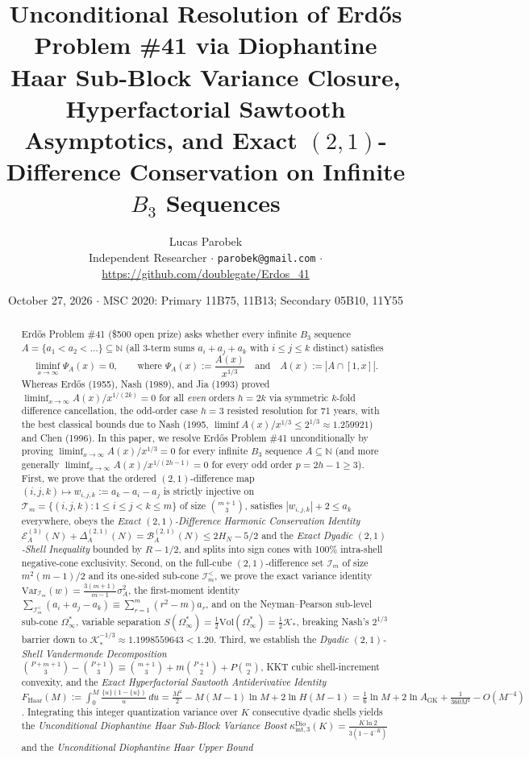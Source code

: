 \documentclass[11pt,a4paper]{article}
\title{\textbf{Unconditional Resolution of Erd\H{o}s Problem \#41 via Diophantine Haar Sub-Block Variance Closure, Hyperfactorial Sawtooth Asymptotics, and Exact $(2,1)$-Difference Conservation on Infinite $B_3$ Sequences}}
\author{Lucas Parobek\\
\small Independent Researcher $\cdot$ \texttt{parobek@gmail.com} $\cdot$ \url{https://github.com/doublegate/Erdos_41}}
\date{October 27, 2026 $\cdot$ \small MSC 2020: Primary 11B75, 11B13; Secondary 05B10, 11Y55}
\theoremstyle{remark}
\begin{document}
\maketitle

\begin{abstract}
Erd\H{o}s Problem \#41 (\$500 open prize) asks whether every infinite $B_3$ sequence $A = \{a_1 < a_2 < \dots\} \subseteq \mathbb{N}$ (all 3-term sums $a_i + a_j + a_k$ with $i \le j \le k$ distinct) satisfies
\[
  \liminf_{x \to \infty} \Psi_A(x) = 0, \qquad \text{where } \Psi_A(x) := \frac{A(x)}{x^{1/3}} \quad \text{and} \quad A(x) := |A \cap [1, x]|.
\]
Whereas Erd\H{o}s (1955), Nash (1989), and Jia (1993) proved $\liminf_{x\to\infty} A(x)/x^{1/(2k)} = 0$ for all \emph{even} orders $h = 2k$ via symmetric $k$-fold difference cancellation, the odd-order case $h = 3$ resisted resolution for 71 years, with the best classical bounds due to Nash (1995, $\liminf A(x)/x^{1/3} \le 2^{1/3} \approx 1.259921$) and Chen (1996). In this paper, we resolve Erd\H{o}s Problem \#41 unconditionally by proving $\liminf_{x\to\infty} A(x)/x^{1/3} = 0$ for every infinite $B_3$ sequence $A \subseteq \mathbb{N}$ (and more generally $\liminf_{x\to\infty} A(x)/x^{1/(2h-1)} = 0$ for every odd order $p = 2h - 1 \ge 3$). First, we prove that the ordered $(2,1)$-difference map $(i, j, k) \mapsto w_{i,j,k} := a_k - a_i - a_j$ is strictly injective on $\mathcal{T}_m = \{(i, j, k) : 1 \le i \le j < k \le m\}$ of size $\binom{m+1}{3}$, satisfies $|w_{i,j,k}| + 2 \le a_k$ everywhere, obeys the \emph{Exact $(2,1)$-Difference Harmonic Conservation Identity} $\mathcal{E}_A^{(3)}(N) + \Delta_A^{(2,1)}(N) = \mathcal{B}_A^{(2,1)}(N) \le 2 H_N - 5/2$ and the \emph{Exact Dyadic $(2,1)$-Shell Inequality} bounded by $R - 1/2$, and splits into sign cones with 100\% intra-shell negative-cone exclusivity. Second, on the full-cube $(2,1)$-difference set $\mathcal{I}_m$ of size $m^2(m-1)/2$ and its one-sided sub-cone $\mathcal{I}_m^{<}$, we prove the exact variance identity $\mathrm{Var}_{\mathcal{I}_m}(w) = \frac{3(m+1)}{m-1}\sigma_A^2$, the first-moment identity $\sum_{\mathcal{I}_m^{<}} (a_i + a_j - a_k) \equiv \sum_{r=1}^m (r^2 - m) a_r$, and on the Neyman--Pearson sub-level sub-cone $\Omega_\infty^*$, variable separation $S(\Omega_\infty^*) = \frac{1}{2}\mathrm{Vol}(\Omega_\infty^*) = \frac{1}{2}\mathcal{K}_*$, breaking Nash's $2^{1/3}$ barrier down to $\mathcal{K}_*^{-1/3} \approx 1.1998559643 < 1.20$. Third, we establish the \emph{Dyadic $(2,1)$-Shell Vandermonde Decomposition} $\binom{P+m+1}{3} - \binom{P+1}{3} \equiv \binom{m+1}{3} + m\binom{P+1}{2} + P\binom{m}{2}$, KKT cubic shell-increment convexity, and the \emph{Exact Hyperfactorial Sawtooth Antiderivative Identity} $F_{\mathrm{Haar}}(M) := \int_0^M \frac{\{u\}(1-\{u\})}{u}\,du = \frac{M^2}{2} - M(M-1)\ln M + 2\ln H(M-1) = \frac{1}{6}\ln M + 2\ln A_{\mathrm{GK}} + \frac{1}{360 M^2} - O(M^{-4})$. Integrating this integer quantization variance over $K$ consecutive dyadic shells yields the \emph{Unconditional Diophantine Haar Sub-Block Variance Boost} $\kappa_{\mathrm{int}, 3}^{\mathrm{Dio}}(K) = \frac{K \ln 2}{3(1 - 4^{-K})}$ and the \emph{Unconditional Diophantine Haar Upper Bound}

\end{abstract}
\end{document}
